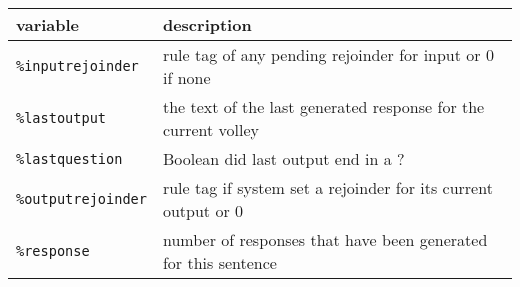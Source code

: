 \documentclass[]{article}
\begin{document}
\begin{longtable}[]{@{}ll@{}}
\toprule
\begin{minipage}[b]{0.12\columnwidth}\raggedright\strut
variable\strut
\end{minipage} & \begin{minipage}[b]{0.10\columnwidth}\raggedright\strut
description\strut
\end{minipage}\tabularnewline
\midrule
\endhead
\begin{minipage}[t]{0.12\columnwidth}\raggedright\strut
\texttt{\%inputrejoinder}\strut
\end{minipage} & \begin{minipage}[t]{0.10\columnwidth}\raggedright\strut
rule tag of any pending rejoinder for input or 0 if none\strut
\end{minipage}\tabularnewline
\begin{minipage}[t]{0.12\columnwidth}\raggedright\strut
\texttt{\%lastoutput}\strut
\end{minipage} & \begin{minipage}[t]{0.10\columnwidth}\raggedright\strut
the text of the last generated response for the current volley\strut
\end{minipage}\tabularnewline
\begin{minipage}[t]{0.12\columnwidth}\raggedright\strut
\texttt{\%lastquestion}\strut
\end{minipage} & \begin{minipage}[t]{0.10\columnwidth}\raggedright\strut
Boolean did last output end in a ?\strut
\end{minipage}\tabularnewline
\begin{minipage}[t]{0.12\columnwidth}\raggedright\strut
\texttt{\%outputrejoinder}\strut
\end{minipage} & \begin{minipage}[t]{0.10\columnwidth}\raggedright\strut
rule tag if system set a rejoinder for its current output or 0\strut
\end{minipage}\tabularnewline
\begin{minipage}[t]{0.12\columnwidth}\raggedright\strut
\texttt{\%response}\strut
\end{minipage} & \begin{minipage}[t]{0.10\columnwidth}\raggedright\strut
number of responses that have been generated for this sentence\strut
\end{minipage}\tabularnewline
\bottomrule
\end{longtable}
\end{document}
